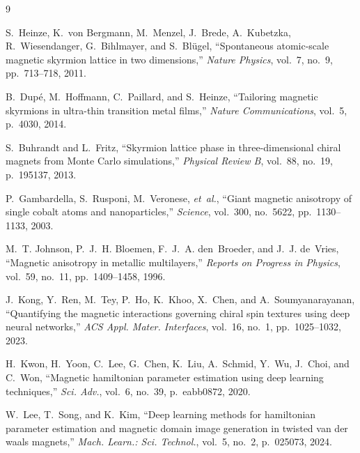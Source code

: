 \documentclass[review,12pt]{report}
\begin{document}
\begin{thebibliography}{9}

S.~Heinze, K.~von Bergmann, M.~Menzel, J.~Brede, A.~Kubetzka, R.~Wiesendanger, G.~Bihlmayer, and S.~Bl\"ugel, ``Spontaneous atomic-scale magnetic skyrmion lattice in two dimensions,'' {\em Nature Physics}, vol.~7, no.~9, pp.~713--718, 2011.

B.~Dup\'e, M.~Hoffmann, C.~Paillard, and S.~Heinze, ``Tailoring magnetic skyrmions in ultra-thin transition metal films,'' {\em Nature Communications}, vol.~5, p.~4030, 2014.

S.~Buhrandt and L.~Fritz, ``Skyrmion lattice phase in three-dimensional chiral magnets from Monte Carlo simulations,'' {\em Physical Review B}, vol.~88, no.~19, p.~195137, 2013.

P.~Gambardella, S.~Rusponi, M.~Veronese, {\em et~al.}, ``Giant magnetic anisotropy of single cobalt atoms and nanoparticles,'' {\em Science}, vol.~300, no.~5622, pp.~1130--1133, 2003.

M.~T. Johnson, P.~J.~H. Bloemen, F.~J.~A. den~Broeder, and J.~J. de~Vries, ``Magnetic anisotropy in metallic multilayers,'' {\em Reports on Progress in Physics}, vol.~59, no.~11, pp.~1409--1458, 1996.

J.~Kong, Y.~Ren, M.~Tey, P.~Ho, K.~Khoo, X.~Chen, and A.~Soumyanarayanan, ``Quantifying the magnetic interactions governing chiral spin textures using deep neural networks,'' {\em ACS Appl. Mater. Interfaces}, vol.~16, no.~1, pp.~1025--1032, 2023.

H.~Kwon, H.~Yoon, C.~Lee, G.~Chen, K.~Liu, A.~Schmid, Y.~Wu, J.~Choi, and C.~Won, ``Magnetic hamiltonian parameter estimation using deep learning techniques,'' {\em Sci. Adv.}, vol.~6, no.~39, p.~eabb0872, 2020.

W.~Lee, T.~Song, and K.~Kim, ``Deep learning methods for hamiltonian parameter estimation and magnetic domain image generation in twisted van der waals magnets,'' {\em Mach. Learn.: Sci. Technol.}, vol.~5, no.~2, p.~025073, 2024.

\end{thebibliography}
\end{document}
